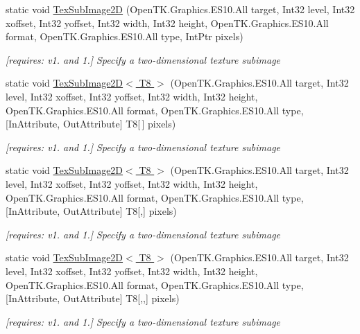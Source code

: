 \begin{DoxyCompactItemize}
static void \hyperlink{class_open_t_k_1_1_graphics_1_1_e_s10_1_1_g_l_a05689d85c105831aad0c3d7ff3e7991e}{Tex\-Sub\-Image2\-D} (Open\-T\-K.\-Graphics.\-E\-S10.\-All target, Int32 level, Int32 xoffset, Int32 yoffset, Int32 width, Int32 height, Open\-T\-K.\-Graphics.\-E\-S10.\-All format, Open\-T\-K.\-Graphics.\-E\-S10.\-All type, Int\-Ptr pixels)
\begin{DoxyCompactList}\small\item\em \mbox{[}requires\-: v1. and 1.\mbox{]} Specify a two-\/dimensional texture subimage \end{DoxyCompactList}\item 
static void \hyperlink{class_open_t_k_1_1_graphics_1_1_e_s10_1_1_g_l_a4c6ec89f2254cf080256367e4bd50672}{Tex\-Sub\-Image2\-D$<$ T8 $>$} (Open\-T\-K.\-Graphics.\-E\-S10.\-All target, Int32 level, Int32 xoffset, Int32 yoffset, Int32 width, Int32 height, Open\-T\-K.\-Graphics.\-E\-S10.\-All format, Open\-T\-K.\-Graphics.\-E\-S10.\-All type, \mbox{[}In\-Attribute, Out\-Attribute\mbox{]} T8\mbox{[}$\,$\mbox{]} pixels)
\begin{DoxyCompactList}\small\item\em \mbox{[}requires\-: v1. and 1.\mbox{]} Specify a two-\/dimensional texture subimage \end{DoxyCompactList}\item 
static void \hyperlink{class_open_t_k_1_1_graphics_1_1_e_s10_1_1_g_l_a1f62f9eab51c16b34c386b728bba3748}{Tex\-Sub\-Image2\-D$<$ T8 $>$} (Open\-T\-K.\-Graphics.\-E\-S10.\-All target, Int32 level, Int32 xoffset, Int32 yoffset, Int32 width, Int32 height, Open\-T\-K.\-Graphics.\-E\-S10.\-All format, Open\-T\-K.\-Graphics.\-E\-S10.\-All type, \mbox{[}In\-Attribute, Out\-Attribute\mbox{]} T8\mbox{[},\mbox{]} pixels)
\begin{DoxyCompactList}\small\item\em \mbox{[}requires\-: v1. and 1.\mbox{]} Specify a two-\/dimensional texture subimage \end{DoxyCompactList}\item 
static void \hyperlink{class_open_t_k_1_1_graphics_1_1_e_s10_1_1_g_l_a0a9b5d98cabaa41b73b2bbb7d228d8f6}{Tex\-Sub\-Image2\-D$<$ T8 $>$} (Open\-T\-K.\-Graphics.\-E\-S10.\-All target, Int32 level, Int32 xoffset, Int32 yoffset, Int32 width, Int32 height, Open\-T\-K.\-Graphics.\-E\-S10.\-All format, Open\-T\-K.\-Graphics.\-E\-S10.\-All type, \mbox{[}In\-Attribute, Out\-Attribute\mbox{]} T8\mbox{[},,\mbox{]} pixels)
\begin{DoxyCompactList}\small\item\em \mbox{[}requires\-: v1. and 1.\mbox{]} Specify a two-\/dimensional texture subimage \end{DoxyCompactList}\item 

\end{DoxyCompactItemize}
